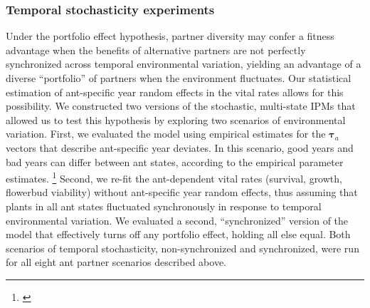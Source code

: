 \documentclass[11pt]{article}
\newcommand{\tom}[2]{{\color{red}{#1}}\footnote{\textit{\color{red}{#2}}}}
\begin{document}

\subsubsection*{Temporal stochasticity experiments}
Under the portfolio effect hypothesis, partner diversity may confer a fitness advantage when the benefits of alternative partners are not perfectly synchronized across temporal environmental variation, yielding an advantage of a diverse ``portfolio'' of partners when the environment fluctuates. 
Our statistical estimation of ant-specific year random effects in the vital rates allows for this possibility. 
We constructed two versions of the stochastic, multi-state IPMs that allowed us to test this hypothesis by exploring two scenarios of environmental variation. 
First, we evaluated the model using empirical estimates for the $\pmb{\tau}_{a}$ vectors that describe ant-specific year deviates. 
In this scenario, good years and bad years can differ between ant states, according to the empirical parameter estimates. 
\tom{We also quantified from the fitted random effects how tightly inter-annual variation was correlated between ant states.}{Worth doing!} 
Second, we re-fit the ant-dependent vital rates (survival, growth, flowerbud viability) without ant-specific year random effects, thus assuming that plants in all ant states fluctuated synchronously in response to temporal environmental variation. 
We evaluated a second, ``synchronized'' version of the model that effectively turns off any portfolio effect, holding all else equal. 
Both scenarios of temporal stochasticity, non-synchronized and synchronized, were run for all eight ant partner scenarios described above. 
\end{document}
